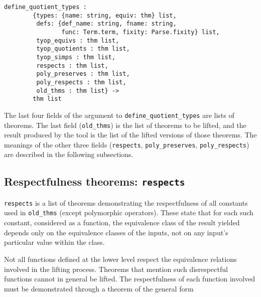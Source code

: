\documentclass[envcountsame,runningheads]{llncs}
\begin{document}
\begin{verbatim}
define_quotient_types : 
        {types: {name: string, equiv: thm} list,
         defs: {def_name: string, fname: string,
                func: Term.term, fixity: Parse.fixity} list,
         tyop_equivs : thm list,
         tyop_quotients : thm list,
         tyop_simps : thm list,
         respects : thm list,
         poly_preserves : thm list,
         poly_respects : thm list,
         old_thms : thm list} ->
        thm list
\end{verbatim}

\noindent
The last four fields of the argument to {\tt define\_quotient\_types}
are lists of theorems.  The last field ({\tt old\_thms})
is the list of theorems to be lifted, and the
result produced by the tool is
the list of the lifted versions of those theorems.
The meanings of the other three fields
({\tt respects}, {\tt poly\_preserves}, {\tt poly\_respects})
are described in the following subsections.




%
\subsection{Respectfulness theorems: {\tt respects}}
%
\label{respectfulness}

{\tt respects} is a list of theorems demonstrating the
respectfulness of all constants used in {\tt old\_thms}
(except polymorphic operators).
These state that for each such constant,
considered as a function,
the equivalence class of the result yielded
depends only on the equivalence classes of the inputs,
not on any input's particular
value
within the class.

Not all functions defined at the lower level
respect the equivalence relations involved in the
lifting process.  Theorems that mention such disrespectful functions
cannot in general be lifted. 
The respectfulness of each function involved must be
demonstrated through a theorem of the general form
\end{document}
